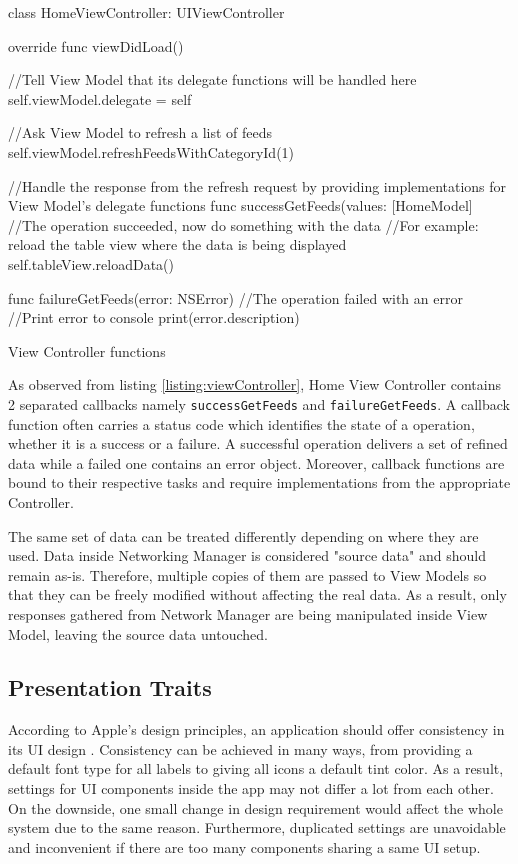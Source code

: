 \documentclass[11pt,a4paper,oneside,article]{memoir}
\begin{document}
\begin{listing}[h]
\begin{SwiftCode}

class HomeViewController: UIViewController{
    override func viewDidLoad() {
        //Tell View Model that its delegate functions will be handled here
        self.viewModel.delegate = self
        
        //Ask View Model to refresh a list of feeds 
        self.viewModel.refreshFeedsWithCategoryId(1)
    }
    
    //Handle the response from the refresh request by providing implementations for View Model's delegate functions
    func successGetFeeds(values: [HomeModel]{
        //The operation succeeded, now do something with the data
        //For example: reload the table view where the data is being displayed
        self.tableView.reloadData()
    }
    
    func failureGetFeeds(error: NSError){
        //The operation failed with an error
        //Print error to console
        print(error.description)
    }    
}
\end{SwiftCode}
\caption{View Controller functions}
\label{listing:viewController}
\end{listing}

 As observed from listing \ref{listing:viewController}, Home View Controller contains 2 separated callbacks namely \texttt{successGetFeeds} and \texttt{failureGetFeeds}. A \gls{callback} function often carries a status code which identifies the state of a operation, whether it is a success or a failure. A successful operation delivers a set of refined data while a failed one contains an error object. Moreover, \gls{callback} functions are bound to their respective tasks and require implementations from the appropriate Controller.
 
The same set of data can be treated differently depending on where they are used. Data inside Networking Manager is considered "source data" and should remain as-is. Therefore, multiple copies of them are passed to View Models so that they can be freely modified without affecting the real data. As a result, only responses gathered from Network Manager are being manipulated inside View Model, leaving the source data untouched.

\subsection{Presentation Traits}\label{presentationtraits}
According to Apple's design principles, an application should offer consistency in its UI design \cite{apple:design}. Consistency can be achieved in many ways, from providing a default font type for all labels to giving all icons a default tint color. As a result, settings for UI components inside the app may not differ a lot from each other. On the downside, one small change in design requirement would affect the whole system due to the same reason. Furthermore, duplicated settings are unavoidable and inconvenient if there are too many components sharing a same UI setup.
\end{document}
